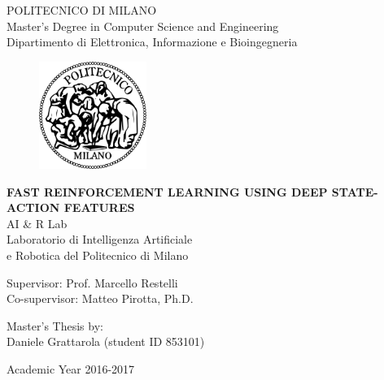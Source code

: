 \thispagestyle{empty}
\vspace*{-1.5cm} \bfseries{
\begin{center}
  \large
  POLITECNICO DI MILANO\\
  \normalsize
  Master's Degree in Computer Science and Engineering\\
  Dipartimento di Elettronica, Informazione e Bioingegneria\\
  
  \vspace{0.6cm}
  \begin{figure}[htbp]
    \begin{center}
      \includegraphics[width=3.5cm]{./pictures/logopm.png}
    \end{center}
  \end{figure}
  \vspace*{0.3cm} \LARGE



  \textbf{FAST REINFORCEMENT LEARNING USING DEEP STATE-ACTION FEATURES}\\



  \vspace*{.75truecm} \large
  AI \& R Lab \\
  Laboratorio di Intelligenza Artificiale \\
  e Robotica del Politecnico di Milano
\end{center}
\vspace*{3.0cm} \large
\begin{flushleft}


  Supervisor: Prof. Marcello Restelli \\
  Co-supervisor: Matteo Pirotta, Ph.D.

\end{flushleft}
\vspace*{1.0cm}
\begin{flushright}


  Master's Thesis by:\\ Daniele Grattarola (student ID 853101)


\end{flushright}
\vspace*{0.5cm}
\begin{center}



  Academic Year 2016-2017
\end{center} \clearpage
}

